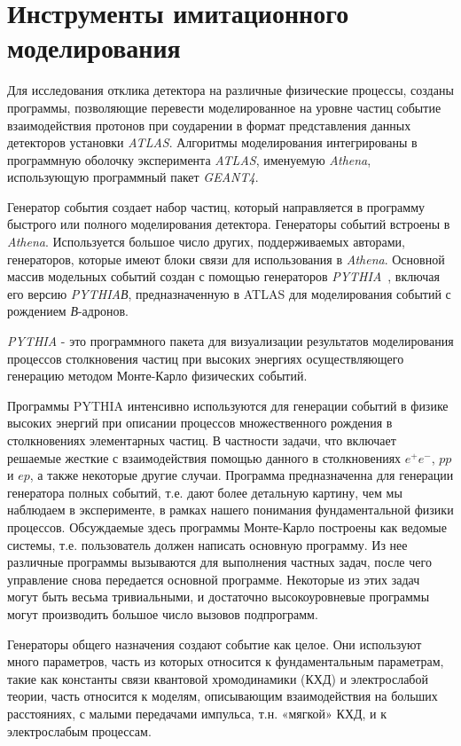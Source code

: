 \section{Инструменты имитационного моделирования}



Для исследования отклика детектора на различные физические процессы, созданы программы, позволяющие перевести моделированное на уровне частиц событие  взаимодействия протонов при соударении в формат представления данных детекторов установки \textit{ATLAS}. Алгоритмы моделирования интегрированы в программную оболочку эксперимента  \textit{ATLAS}, именуемую \textit{Athena}, использующую программный пакет \textit{GEANT4}.

Генератор события создает набор частиц, который направляется в программу быстрого или полного моделирования детектора. Генераторы событий встроены в \textit{Athena}. Используется большое число других, поддерживаемых авторами, генераторов, которые имеют блоки связи для использования в \textit{Athena}. Основной массив модельных событий создан с помощью генераторов \textit{PYTHIA}~\cite{2part-pythia-all}, включая его версию \textit{PYTHIAВ},  предназначенную в  ATLAS для моделирования событий с рождением \textit{В}-адронов.

\textit{PYTHIA} - это программного пакета для визуализации результатов моделирования процессов столкновения частиц при высоких энергиях осуществляющего генерацию методом Монте-Карло физических событий.

Программы PYTHIA интенсивно используются для генерации событий в физике высоких энергий при описании процессов множественного рождения в столкновениях элементарных частиц. В частности задачи, что включает решаемые жесткие с взаимодействия помощью данного в столкновениях $e^+e^-$, $pp$ и $ep$, а также некоторые другие случаи. Программа предназначенна для генерации генератора полных событий, т.е. дают более детальную картину, чем мы наблюдаем в эксперименте, в рамках нашего понимания фундаментальной физики процессов. Обсуждаемые здесь программы Монте-Карло построены как ведомые системы, т.е. пользователь должен написать основную программу. Из нее различные программы вызываются для выполнения частных задач, после чего управление снова передается основной программе. Некоторые из этих задач могут быть весьма тривиальными, и достаточно высокоуровневые программы могут производить большое число вызовов подпрограмм.

Генераторы общего назначения создают событие как целое. Они используют много параметров, часть из которых относится к фундаментальным параметрам, такие как константы связи квантовой хромодинамики (КХД) и электрослабой теории, часть относится к моделям, описывающим взаимодействия на больших расстояниях, с малыми передачами импульса, т.н. «мягкой» КХД, и к электрослабым процессам.

